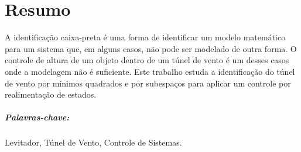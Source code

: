 \chapter*{Resumo}
\thispagestyle{empty}

A identificação caixa-preta é uma forma de identificar um modelo matemático para um sistema que, em alguns casos, não pode ser modelado de outra forma. O controle de altura de um objeto dentro de um túnel de vento é um desses casos onde a modelagem não é suficiente. Este trabalho estuda a identificação do túnel de vento por mínimos quadrados e por subespaços para aplicar um controle por realimentação de estados.

\vspace{50pt}

\paragraph{Palavras-chave:} Levitador, Túnel de Vento, Controle de Sistemas.
